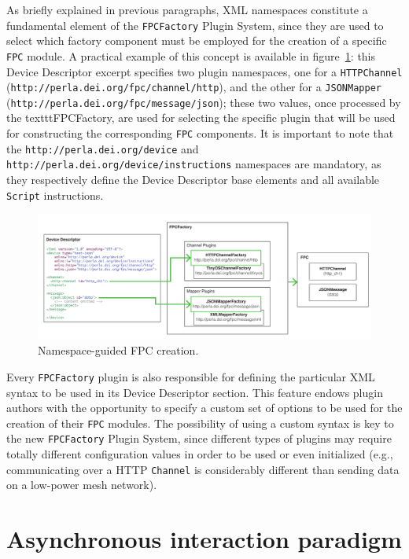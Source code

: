As briefly explained in previous paragraphs, XML namespaces constitute a
fundamental element of the \texttt{FPCFactory} Plugin System, since they are
used to select which factory component must be employed for the creation of a
specific \texttt{FPC} module. A practical example of this concept is available
in figure~\ref{fig:dd_namespace}: this Device Descriptor excerpt specifies two
plugin namespaces, one for a \texttt{HTTPChannel}
(\texttt{http://perla.dei.org/fpc/channel/http}), and the other for a
\texttt{JSONMapper} (\texttt{http://perla.dei.org/fpc/message/json}); these two
values, once processed by the texttt{FPCFactory}, are used for selecting the
specific plugin that will be used for constructing the corresponding
\texttt{FPC} components. It is important to note that the
\texttt{http://perla.dei.org/device} and
\texttt{http://perla.dei.org/device/instructions} namespaces are mandatory, as
they respectively define the Device Descriptor base elements and all available
\texttt{Script} instructions.

\begin{figure}[h!]
\center
\includegraphics[width=\textwidth]{imgs/dd_namespace.pdf}
\caption{Namespace-guided FPC creation.}
\label{fig:dd_namespace}
\end{figure}

Every \texttt{FPCFactory} plugin is also responsible for defining the
particular XML syntax to be used in its Device Descriptor section. This feature
endows plugin authors with the opportunity to specify a custom set of options
to be used for the creation of their \texttt{FPC} modules. The possibility of
using a custom syntax is key to the new \texttt{FPCFactory} Plugin System,
since different types of plugins may require totally different configuration
values in order to be used or even initialized (e.g., communicating over a HTTP
\texttt{Channel} is considerably different than sending data on a low-power
mesh network).


\section{Asynchronous interaction paradigm}
\label{sec:newmiddleware.async}

